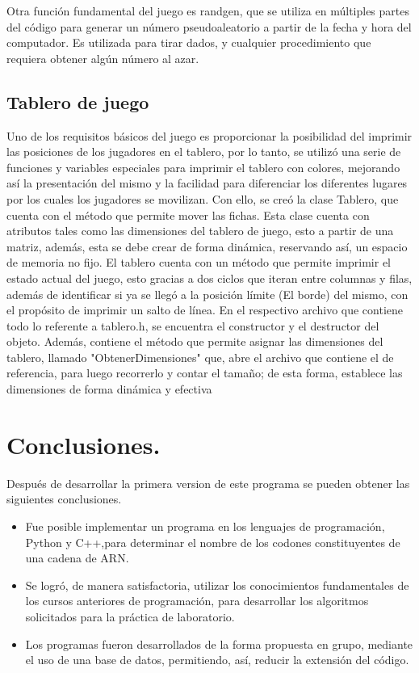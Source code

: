 	Otra función fundamental del juego es randgen, que se utiliza en múltiples partes del
código para generar un número pseudoaleatorio a partir de la fecha y hora del computador. Es 
utilizada para tirar dados, y cualquier procedimiento que requiera obtener algún número al azar.

\subsection{Tablero de juego}

	Uno de los requisitos básicos del juego es proporcionar la posibilidad del imprimir las
posiciones de los jugadores en el tablero, por lo tanto, se utilizó una serie de funciones y 
variables especiales para imprimir el tablero con colores, mejorando así la presentación del mismo
y la facilidad para diferenciar los diferentes lugares por los cuales los jugadores se movilizan.
Con ello, se creó la clase Tablero, que cuenta con el método que permite mover las fichas. Esta
clase cuenta con atributos tales como las dimensiones del tablero de juego, esto a partir de una
matriz, además, esta se debe crear de forma dinámica, reservando así, un espacio de memoria no 
fijo.
	El tablero cuenta con un método que permite imprimir el estado actual del juego, esto
gracias a dos ciclos que iteran entre columnas y filas, además de identificar si ya se llegó a 
la posición límite (El borde) del mismo, con el propósito de imprimir un salto de línea.
	En el respectivo archivo que contiene todo lo referente a tablero.h, se encuentra el 
constructor y el destructor del objeto. Además, contiene el método que permite asignar las
dimensiones del tablero, llamado "ObtenerDimensiones" que, abre el archivo que contiene el
de referencia, para luego recorrerlo y contar el tamaño; de esta forma, establece las 
dimensiones de forma dinámica y efectiva

 
\section{Conclusiones.}
Después de desarrollar la primera version de este programa se pueden obtener las siguientes conclusiones.
\begin{itemize}
	\item Fue posible implementar un programa en los lenguajes de programación, Python y C++,para determinar el nombre de los codones constituyentes de una cadena de ARN.
	\item Se logró, de manera satisfactoria, utilizar los conocimientos fundamentales de los cursos anteriores de programación, para desarrollar los algoritmos solicitados para la práctica de laboratorio.
	\item Los programas fueron desarrollados de la forma propuesta en grupo, mediante el uso de una base de datos, permitiendo, así, reducir la extensión del código.
\end{itemize}
